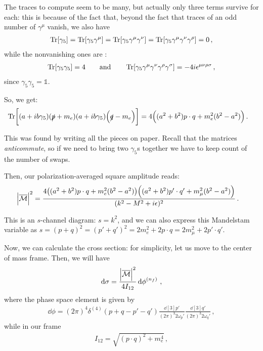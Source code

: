 \documentclass[main.tex]{subfiles}
\begin{document}
The traces to compute seem to be many, but actually only three terms survive for each: this is because of the fact that, beyond the fact that traces of an odd number of \(\gamma^{\mu }\) vanish, we also have 
%
\begin{align}
\Tr[\gamma_5 ] 
= \Tr[\gamma_5 \gamma^{\mu }]
= \Tr[\gamma_5 \gamma^{\mu } \gamma^{\nu }]
= \Tr[\gamma_5 \gamma^{\mu } \gamma^{\nu } \gamma^{\rho }]
= 0
\,,
\end{align}
%
while the nonvanishing ones are \cite[section 6.3]{kumerickiFeynmanDiagramsBeginners2016}: 
%
\begin{align}
\Tr[\gamma_5 \gamma_5 ] = 4 \qquad \text{and} \qquad
\Tr[\gamma_5 \gamma^{\mu } \gamma^{\nu } \gamma^{\rho } \gamma^{\sigma }] = -4i \epsilon^{\mu \nu \rho \sigma }
\,,
\end{align}
%
since \(\gamma_{5} \gamma_5  = \mathbb{1} \). 

So, we get: 
%
\begin{align}
\Tr[ (a + i b \gamma_5 ) (\slashed{p} + m_e) \qty(a + i b \gamma_5 ) \qty(\slashed{q} - m_e)] &= 4 \qty( (a^2 + b^2) p \cdot q +  m_e^2 ( b^2 -a ^2))
\,.
\end{align}

This was found by writing all the pieces on paper. Recall that the matrices \emph{anticommute}, so if we need to bring two \(\gamma_5\)s together we have to keep count of the number of swaps. 

Then, our polarization-averaged square amplitude reads: 
%
\begin{align}
\abs{\mathcal{\overline{M}}}^2
&=
\frac{4 \qty( (a^2 + b^2) p \cdot q +  m_e^2 ( b^2 -a ^2)) \qty( (a^2 + b^2) p' \cdot q' +  m_\mu^2 ( b^2 -a ^2))}{ (k^2- M^2 + i \epsilon)^2 }
\,.
\end{align}

This is an \(s\)-channel diagram: \(s = k^2\), and we can also express this Mandelstam variable as \(s = (p + q)^2 = (p'+ q')^2 = 2 m_e^2 + 2p \cdot q  = 2 m_\mu^2 + 2 p' \cdot q'\).

Now, we can calculate the cross section: for simplicity, let us move to the center of mass frame. Then, we will have 
%
\begin{align}
\dd{\sigma } = \frac{\abs{\mathcal{\overline{M}}}^2}{4 I_{12}} \dd{\phi }^{(n_f)}
\,,
\end{align}
%
where the phase space element is given by 
%
\begin{align}
\dd{\phi } = (2 \pi )^{4} \delta^{(4)} (p+q-p'-q') 
\frac{ \dd[3]{p'}}{(2 \pi )^3 2 \omega_{p}'} 
\frac{ \dd[3]{q'}}{(2 \pi )^3 2 \omega_{q}'} 
\,,
\end{align}
%
while in our frame 
%
\begin{align}
I_{12} =  \sqrt{(p \cdot q)^2 + m_e^{4}}
\,,
\end{align}
%
\end{document}

